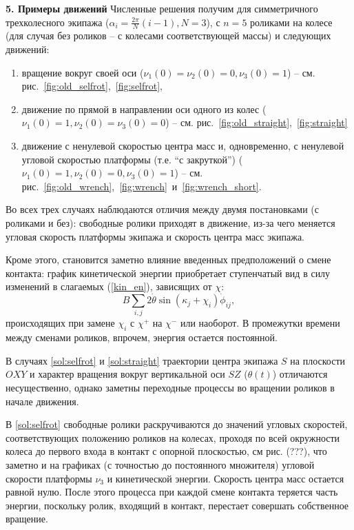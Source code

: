
{\bf 5. Примеры движений}
Численные решения получим для симметричного трехколесного экипажа ($\alpha_i = \frac{2\pi}{N}(i - 1), N = 3$), с $n = 5$ роликами на колесе (для случая без роликов -- с колесами соответствующей массы) и следующих движений:
\begin{enumerate}
  \item \label{sol:selfrot} вращение вокруг своей оси ($\nu_1(0) = \nu_2(0) = 0, \nu_3(0) = 1$) -- см. рис.~\ref{fig:old_selfrot},~\ref{fig:selfrot},
  \item \label{sol:straight} движение по прямой в направлении оси одного из колес ($\nu_1(0) = 1, \nu_2(0) = \nu_3(0) = 0$) -- см. рис.~\ref{fig:old_straight},~\ref{fig:straight}
  \item \label{sol:wrench} движение с ненулевой скоростью центра масс и, одновременно, с ненулевой угловой скоростью платформы (т.е. ``с закруткой'') ($\nu_1(0) = 1, \nu_2(0) = 0, \nu_3(0) = 1$) -- см. рис.~\ref{fig:old_wrench},~\ref{fig:wrench}~и~\ref{fig:wrench_short}.
\end{enumerate}

Во всех трех случаях наблюдаются отличия между двумя постановками (с роликами и без): свободные ролики приходят в движение, из-за чего меняется угловая скорость платформы экипажа и скорость центра масс экипажа.

Кроме этого, становится заметно влияние введенных предположений о смене контакта: график кинетической энергии приобретает ступенчатый вид в силу изменений в слагаемых (\ref{kin_en}), зависящих от $\chi$: 
\begin{equation}\label{sines_in_kin_en}
    B\sum_{i,j}2\dot{\theta}\sin(\kappa_j + \chi_i)\dot{\phi}_{ij},
\end{equation}
происходящих при замене $\chi_i$ с $\chi^+$ на $\chi^-$ или наоборот. В промежутки времени между сменами роликов, впрочем, энергия остается постоянной. 

В случаях \ref{sol:selfrot} и \ref{sol:straight} траектории центра экипажа $S$ на плоскости $OXY$ и характер вращения вокруг вертикальной оси $SZ$ ($\theta(t)$) отличаются несущественно, однако заметны переходные процессы во вращении роликов в начале движения.

В \ref{sol:selfrot} свободные ролики раскручиваются до значений угловых скоростей, соответствующих положению роликов на колесах, проходя по всей окружности колеса до первого входа в контакт с опорной плоскостью, см рис. (???), что заметно и на графиках  (с точностью до постоянного множителя) угловой скорости платформы $\nu_3$ и кинетической энергии. Скорость центра масс остается равной нулю. После этого процесса при каждой смене контакта теряется часть энергии, поскольку ролик, входящий в контакт, перестает совершать собственное вращение. 

